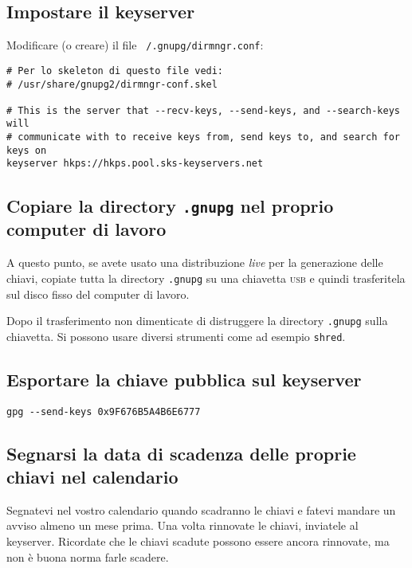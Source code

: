 \documentclass[a4paper,10pt]{article}
\begin{document}
\subsection{Impostare il keyserver}

Modificare (o creare) il file \texttt{~/.gnupg/dirmngr.conf}:

\begin{verbatim}
# Per lo skeleton di questo file vedi:
# /usr/share/gnupg2/dirmngr-conf.skel

# This is the server that --recv-keys, --send-keys, and --search-keys will
# communicate with to receive keys from, send keys to, and search for keys on
keyserver hkps://hkps.pool.sks-keyservers.net
\end{verbatim}

\subsection{Copiare la directory \texttt{.gnupg} nel proprio computer di lavoro}

A questo punto, se avete usato una distribuzione \textit{live} per la generazione delle chiavi, copiate tutta la directory \texttt{.gnupg} su una chiavetta \textsc{usb} e quindi trasferitela sul disco fisso del computer di lavoro.

Dopo il trasferimento non dimenticate di distruggere la directory \texttt{.gnupg} sulla chiavetta. Si possono usare diversi strumenti come ad esempio \texttt{shred}.

\subsection{Esportare la chiave pubblica sul keyserver}

\begin{verbatim}
gpg --send-keys 0x9F676B5A4B6E6777
\end{verbatim}

\subsection{Segnarsi la data di scadenza delle proprie chiavi nel calendario}

Segnatevi nel vostro calendario quando scadranno le chiavi e fatevi mandare un avviso almeno un mese prima. Una volta rinnovate le chiavi, inviatele al keyserver. Ricordate che le chiavi scadute possono essere ancora rinnovate, ma non è buona norma farle scadere.
\end{document}
